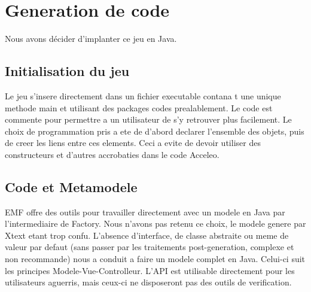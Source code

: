 \documentclass[12pt]{article}
\begin{document}
\section{Generation de code}
Nous avons décider d'implanter ce jeu en Java.
\subsection{Initialisation du jeu}
Le jeu s'insere directement dans un fichier executable contana t une unique methode main et utilisant des packages codes prealablement. Le code est commente pour permettre a un utilisateur de s'y retrouver plus facilement. Le choix de programmation pris a ete de d'abord declarer l'ensemble des objets, puis de creer les liens entre ces elements. Ceci a evite de devoir utiliser des constructeurs et d'autres accrobaties dans le code Acceleo.

\subsection{Code et Metamodele}
EMF offre des outils pour travailler directement avec un modele en Java par l'intermediaire de Factory. Nous n'avons pas retenu ce choix, le modele genere par Xtext etant trop confu. L'absence d'interface, de classe abstraite ou meme de valeur par defaut (sans passer par les traitements post-generation, complexe et non recommande) nous a conduit a faire un modele complet en Java.\newline
Celui-ci suit les principes Modele-Vue-Controlleur. L'API est utilisable directement pour les utilisateurs aguerris, mais ceux-ci ne disposeront pas des outils de verification.
\end{document}
